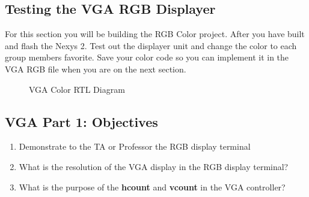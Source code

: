 \documentclass{article}
\begin{document}
% 
% 
% 

\subsection{Testing the VGA RGB Displayer}
For this section you will be building the RGB Color project. After you have built and flash the Nexys 2. Test out the displayer unit and change the color to each group members favorite. Save your color code so you can implement it in the VGA RGB file when you are on the next section.

\begin{figure}[!htbp]
  \centering
  \caption{VGA Color RTL Diagram}
\end{figure}

\subsection{VGA Part 1: Objectives}

\begin{enumerate}
  \item Demonstrate to the TA or Professor the RGB display terminal
  \item What is the resolution of the VGA display in the RGB display terminal?
  \item What is the purpose of the \textbf{hcount} and \textbf{vcount} in the VGA controller?
\end{enumerate}
\end{document}
